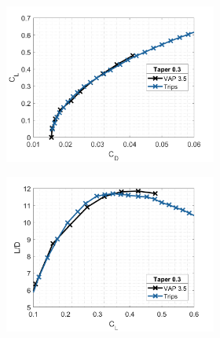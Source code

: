 \begin{figure}
\begin{figure}[H]
\begin{subfigure}[b]{0.45\textwidth}
     \end{subfigure}
     \hfill

        
\end{figure}


\begin{figure}[H]
     \centering
     \begin{subfigure}[b]{0.45\textwidth}
         \centering
         \includegraphics[width=\textwidth]{05_Results/Figs/VAP/genMAV/taper5a.png}

     \end{subfigure}
     \hfill
     \begin{subfigure}[b]{0.45\textwidth}
         \centering
         \includegraphics[width=\textwidth]{05_Results/Figs/VAP/genMAV/taper5b.png}
      

\end{subfigure}
\end{figure}
\end{figure}
